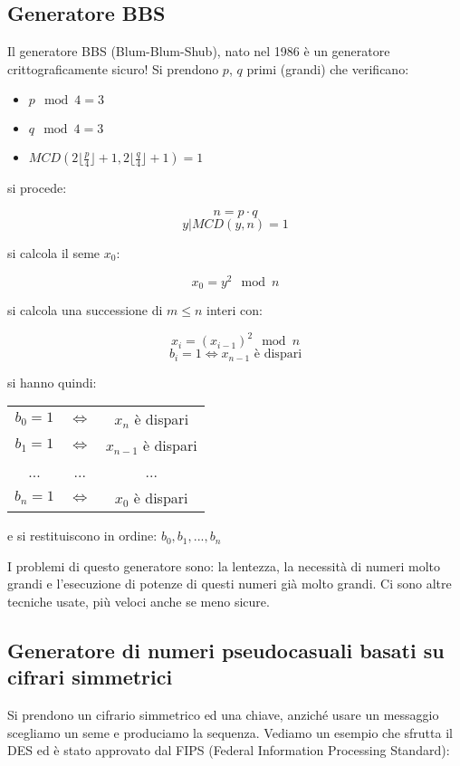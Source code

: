 \subsection{Generatore BBS}
Il generatore BBS (Blum-Blum-Shub), nato nel 1986 è un generatore crittograficamente sicuro! Si prendono $p$, $q$ primi (grandi) che verificano:

\begin{itemize}
    \item $ p \mod 4 = 3 $
    \item $ q \mod 4 = 3 $
    \item $ MCD(2 \lfloor \frac{p}{4} \rfloor + 1, 2 \lfloor \frac{q}{4} \rfloor + 1) = 1 $
\end{itemize}

si procede:

$$ n = p \cdot q $$
$$ y | MCD(y, n) = 1 $$

si calcola il seme $x_{0}$:

$$ x_{0} = y^{2} \mod n $$

si calcola una successione di $ m \leq n $ interi con:

$$ x_{i} = (x_{i-1})^{2} \mod n $$
$$ b_{i} = 1 \Longleftrightarrow x_{n-1} \text{ è dispari} $$

si hanno quindi:

\begin{table}[!ht]
    \centering
    \begin{tabular}{c c c}
        $b_{0} = 1$ & $ \Longleftrightarrow $ & $ x_{n} $ è dispari\\
        $b_{1} = 1$ & $ \Longleftrightarrow $ & $ x_{n-1} $ è dispari\\
        ... & ... & ... \\
        $b_{n} = 1$ & $ \Longleftrightarrow $ & $ x_{0} $ è dispari\\
    \end{tabular}
\end{table}

e si restituiscono in ordine: $b_{0}, b_{1}, ..., b_{n}$

I problemi di questo generatore sono: la lentezza, la necessità di numeri molto grandi e l'esecuzione di potenze di questi numeri già molto grandi. Ci sono altre tecniche usate, più veloci anche se meno sicure.

\subsection{Generatore di numeri pseudocasuali basati su cifrari simmetrici}
Si prendono un cifrario simmetrico ed una chiave, anziché usare un messaggio scegliamo un seme e produciamo la sequenza. Vediamo un esempio che sfrutta il DES ed è stato approvato dal FIPS (Federal Information Processing Standard):

